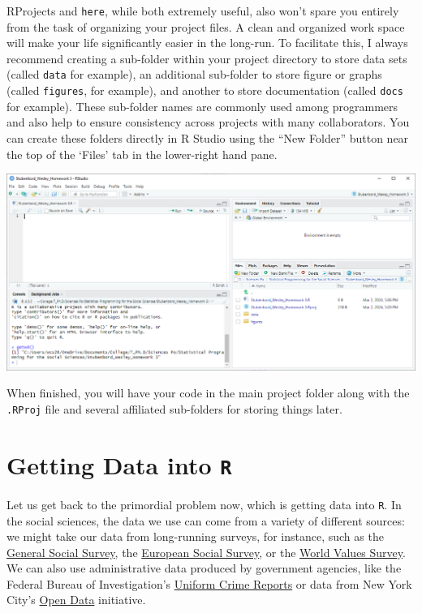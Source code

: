 \documentclass[
  letterpaper,
]{book}
\begin{document}
RProjects and \texttt{here}, while both extremely useful, also won't
spare you entirely from the task of organizing your project files. A
clean and organized work space will make your life significantly easier
in the long-run. To facilitate this, I always recommend creating a
sub-folder within your project directory to store data sets (called
\texttt{data} for example), an additional sub-folder to store figure or
graphs (called \texttt{figures}, for example), and another to store
documentation (called \texttt{docs} for example). These sub-folder names
are commonly used among programmers and also help to ensure consistency
across projects with many collaborators. You can create these folders
directly in R Studio using the ``New Folder'' button near the top of the
`Files' tab in the lower-right hand pane.

\includegraphics{images/R-Project-sub-folders.PNG}

When finished, you will have your code in the main project folder along
with the \texttt{.RProj} file and several affiliated sub-folders for
storing things later.

\hypertarget{getting-data-into-r}{%
\section{\texorpdfstring{Getting Data into
\texttt{R}}{Getting Data into R}}\label{getting-data-into-r}}

Let us get back to the primordial problem now, which is getting data
into \texttt{R}. In the social sciences, the data we use can come from a
variety of different sources: we might take our data from long-running
surveys, for instance, such as the \href{https://gss.norc.org/}{General
Social Survey}, the
\href{https://www.europeansocialsurvey.org/}{European Social Survey}, or
the \href{https://www.worldvaluessurvey.org/}{World Values Survey}. We
can also use administrative data produced by government agencies, like
the Federal Bureau of Investigation's
\href{https://www.fbi.gov/how-we-can-help-you/more-fbi-services-and-information/ucr}{Uniform
Crime Reports} or data from New York City's
\href{https://opendata.cityofnewyork.us/}{Open Data} initiative.
\end{document}
